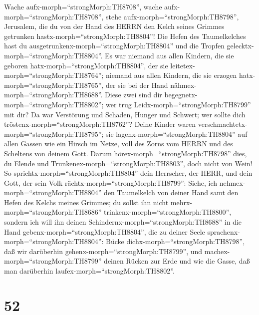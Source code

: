 Wache aufx-morph=``strongMorph:TH8708'', wache
aufx-morph=``strongMorph:TH8708'', stehe
aufx-morph=``strongMorph:TH8798'', Jerusalem, die du von der Hand des
HERRN den Kelch seines Grimmes getrunken
hastx-morph=``strongMorph:TH8804''! Die Hefen des Taumelkelches hast du
ausgetrunkenx-morph=``strongMorph:TH8804'' und die Tropfen
gelecktx-morph=``strongMorph:TH8804''.  Es war niemand aus
allen Kindern, die sie geboren hatx-morph=``strongMorph:TH8804'', der
sie leitetex-morph=``strongMorph:TH8764''; niemand aus allen Kindern,
die sie erzogen hatx-morph=``strongMorph:TH8765'', der sie bei der Hand
nähmex-morph=``strongMorph:TH8688''.  Diese zwei sind dir
begegnetx-morph=``strongMorph:TH8802''; wer trug
Leidx-morph=``strongMorph:TH8799'' mit dir? Da war Verstörung und
Schaden, Hunger und Schwert; wer sollte dich
tröstenx-morph=``strongMorph:TH8762''?  Deine Kinder waren
verschmachtetx-morph=``strongMorph:TH8795''; sie
lagenx-morph=``strongMorph:TH8804'' auf allen Gassen wie ein Hirsch im
Netze, voll des Zorns vom HERRN und des Scheltens von deinem Gott.
 Darum hörex-morph=``strongMorph:TH8798'' dies, du Elende
und Trunkenex-morph=``strongMorph:TH8803'', doch nicht von Wein!
 So sprichtx-morph=``strongMorph:TH8804'' dein Herrscher,
der HERR, und dein Gott, der sein Volk
rächtx-morph=``strongMorph:TH8799'': Siehe, ich
nehmex-morph=``strongMorph:TH8804'' den Taumelkelch von deiner Hand samt
den Hefen des Kelchs meines Grimmes; du sollst ihn nicht
mehrx-morph=``strongMorph:TH8686''
trinkenx-morph=``strongMorph:TH8800'',  sondern ich will
ihn deinen Schindernx-morph=``strongMorph:TH8688'' in die Hand
gebenx-morph=``strongMorph:TH8804'', die zu deiner Seele
sprachenx-morph=``strongMorph:TH8804'': Bücke
dichx-morph=``strongMorph:TH8798'', daß wir darüberhin
gehenx-morph=``strongMorph:TH8799'', und
machex-morph=``strongMorph:TH8799'' deinen Rücken zur Erde und wie die
Gasse, daß man darüberhin laufex-morph=``strongMorph:TH8802''.

\hypertarget{section-51}{%
\section{52}\label{section-51}}

